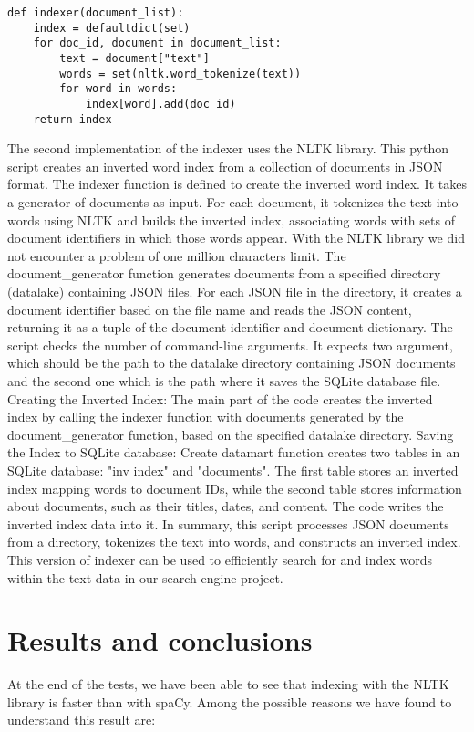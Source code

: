 \documentclass{article}
\begin{document}
\begin{verbatim}
def indexer(document_list):
	index = defaultdict(set)
	for doc_id, document in document_list:
		text = document["text"]
		words = set(nltk.word_tokenize(text))
		for word in words:
			index[word].add(doc_id)
	return index
\end{verbatim}

The second implementation of the indexer uses the NLTK library.
This python script creates an inverted word index
from a collection of documents in JSON format.
The indexer function is defined to create the inverted word index.
It takes a generator of documents as input. For each document,
it tokenizes the text into words using NLTK and builds the inverted index,
associating words with sets of document identifiers in which those words appear.
With the NLTK library we did not encounter a problem of one million characters limit.
The document\_generator function generates documents from a specified
directory (datalake) containing JSON files.
For each JSON file in the directory, it creates a document identifier
based on the file name and reads the JSON content,
returning it as a tuple of the document identifier and document dictionary.
The script checks the number of command-line arguments.
It expects two argument, which should be the path to the datalake directory containing JSON documents
and the second one which is the path where it saves the SQLite database file.
Creating the Inverted Index:
The main part of the code creates the inverted index by
calling the indexer function with documents generated by
the document\_generator function, based on the specified datalake directory.
Saving the Index to SQLite database:
Create datamart function creates two tables in an SQLite database: "inv index" and "documents". 
The first table stores an inverted index mapping words to document IDs, while the second table stores information about documents,
such as their titles, dates, and content. The code writes the inverted index data into it.
In summary, this script processes JSON documents from a directory,
tokenizes the text into words, and constructs an inverted index.
This version of indexer can be used to efficiently search for and index words within the text data in our search engine project.

\section{Results and conclusions}
At the end of the tests, we have been able to see that indexing with the NLTK library is faster
than with spaCy. Among the possible reasons we have found to understand this result are:
\end{document}
